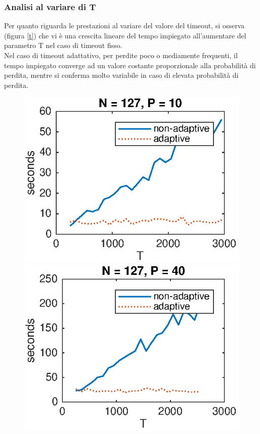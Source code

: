\subsubsection{Analisi al variare di T}
Per quanto riguarda le prestazioni al variare del valore del timeout,
si osserva (figura \ref{t}) che vi è una crescita lineare del tempo impiegato all'aumentare del
parametro T nel caso di timeout fisso.\\
Nel caso di timeout adattativo, per perdite poco o mediamente frequenti,
il tempo impiegato converge ad un valore costante
proporzionale alla probabilità di perdita,
mentre si conferma molto variabile in caso di elevata probabilità di perdita. 
\begin{figure}[!hp]
	\centering
	\includegraphics[scale=0.8]{images/T_N127_P10}
	\includegraphics[scale=0.8]{images/T_N127_P40}

\end{figure}
